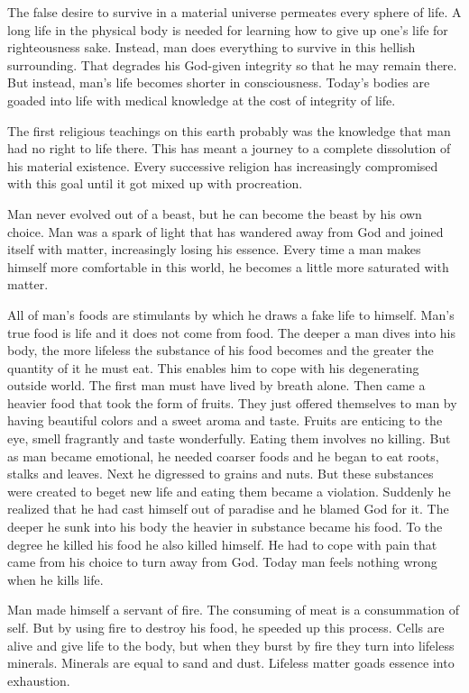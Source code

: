 \documentclass[12pt,letterpaper]{article}
\begin{document}
The false desire to survive in a material universe permeates every
sphere of life. A long life in the physical body is needed for
learning how to give up one's life for righteousness sake. Instead,
man does everything to survive in this hellish surrounding. That
degrades his God-given integrity so that he may remain there. But
instead, man's life becomes shorter in consciousness. Today's bodies
are goaded into life with medical knowledge at the cost of integrity
of life.

The first religious teachings on this earth probably was the knowledge
that man had no right to life there. This has meant a journey to a
complete dissolution of his material existence. Every successive
religion has increasingly compromised with this goal until it got
mixed up with procreation.

Man never evolved out of a beast, but he can become the beast by his
own choice. Man was a spark of light that has wandered away from God
and joined itself with matter, increasingly losing his essence. Every
time a man makes himself more comfortable in this world, he becomes a
little more saturated with matter.

All of man's foods are stimulants by which he draws a fake life to
himself. Man's true food is life and it does not come from food. The
deeper a man dives into his body, the more lifeless the substance of
his food becomes and the greater the quantity of it he must eat. This
enables him to cope with his degenerating outside world.  The first
man must have lived by breath alone. Then came a heavier food that
took the form of fruits. They just offered themselves to man by having
beautiful colors and a sweet aroma and taste. Fruits are enticing to
the eye, smell fragrantly and taste wonderfully. Eating them involves
no killing. But as man became emotional, he needed coarser foods and
he began to eat roots, stalks and leaves. Next he digressed to grains
and nuts. But these substances were created to beget new life and
eating them became a violation. Suddenly he realized that he had cast
himself out of paradise and he blamed God for it. The deeper he sunk
into his body the heavier in substance became his food. To the degree
he killed his food he also killed himself. He had to cope with pain
that came from his choice to turn away from God. Today man feels
nothing wrong when he kills life.

Man made himself a servant of fire. The consuming of meat is a
consummation of self. But by using fire to destroy his food, he
speeded up this process. Cells are alive and give life to the body,
but when they burst by fire they turn into lifeless minerals. Minerals
are equal to sand and dust. Lifeless matter goads essence into
exhaustion.
\end{document}
